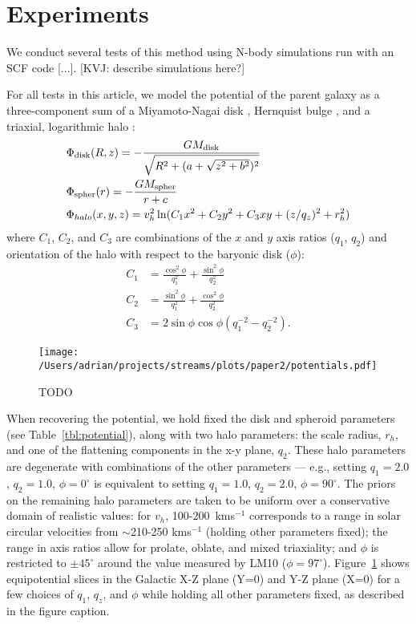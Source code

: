 \documentclass[letterpaper,12pt,preprint]{aastex}
\begin{document}
\section{Experiments}
We conduct several tests of this method using N-body simulations run with an SCF code [...]. [KVJ: describe simulations here?] 

For all tests in this article, we model the potential of the parent galaxy as a three-component sum of a Miyamoto-Nagai disk \citep{}, Hernquist bulge \citep[spheroid;][]{}, and a triaxial, logarithmic halo \citep[e.g.,][]{law10}:
\begin{align}
	&\Phi_{\rm disk}(R,z) = -\frac{GM_{\rm disk}}{\sqrt{R^2 + (a + \sqrt{z^2 + b^2})^2}}\\
	&\Phi_{\rm spher}(r) = -\frac{GM_{\rm spher}}{r + c}\\
	&\Phi_{halo}(x,y,z) = v_{h}^2 \ln(C_1 x^2 + C_2 y^2 + C_3 xy + (z/q_z)^2 + r_h^2)
\end{align}
where $C_1$, $C_2$, and $C_3$ are combinations of the $x$ and $y$ axis
ratios ($q_1$, $q_2$) and orientation of the halo with respect to the
baryonic disk ($\phi$):
\begin{align}
  C_1 &= \frac{\cos^2\phi}{q_1^2} + \frac{\sin^2\phi}{q_2^2}\\
  C_2 &= \frac{\sin^2\phi}{q_1^2} + \frac{\cos^2\phi}{q_2^2}\\
  C_3 &= 2\sin\phi\cos\phi \left(q_1^{-2} - q_2^{-2}\right).
\end{align}

\begin{figure}[h]
\begin{center}
\texttt{[image: /Users/adrian/projects/streams/plots/paper2/potentials.pdf]}
\caption{ TODO }\label{fig:potential}
\end{center}
\end{figure}

When recovering the potential, we hold fixed the disk and spheroid parameters (see Table~\ref{tbl:potential}), along with two halo parameters: the scale radius, $r_h$, and one of the flattening components in the x-y plane, $q_2$. These halo parameters are degenerate with combinations of the other parameters --- e.g., setting $q_1=2.0$, $q_2=1.0$, $\phi=0^\circ$ is equivalent to setting $q_1=1.0$, $q_2=2.0$, $\phi=90^\circ$. The priors on the remaining halo parameters are taken to be uniform over a conservative domain of realistic values: for $v_h$, 100-200~kms$^{-1}$ corresponds to a range in solar circular velocities from $\sim$210-250 kms$^{-1}$ (holding other parameters fixed); the range in axis ratios allow for prolate, oblate, and mixed triaxiality; and $\phi$ is restricted to $\pm45^\circ$ around the value measured by LM10 ($\phi = 97^\circ$). Figure~\ref{fig:potential} shows equipotential slices in the Galactic X-Z plane (Y=0) and Y-Z plane (X=0) for a few choices of  $q_1$,  $q_z$, and $\phi$ while holding all other parameters fixed, as described in the figure caption.
\end{document}
